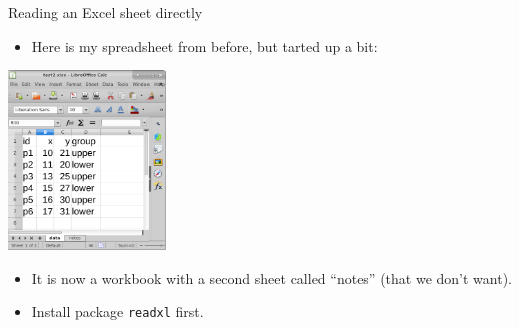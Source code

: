 \documentclass[ignorenonframetext,]{beamer}
\providecommand{\tightlist}{%
  \setlength{\itemsep}{0pt}\setlength{\parskip}{0pt}}
\begin{document}
\begin{frame}[fragile]{Reading an Excel sheet directly}
\protect\hypertarget{reading-an-excel-sheet-directly}{}

\begin{itemize}
\tightlist
\item
  Here is my spreadsheet from before, but tarted up a bit:
\end{itemize}

\includegraphics[width=\textwidth,height=1.875in]{excel.png}

\begin{itemize}
\tightlist
\item
  It is now a workbook with a second sheet called ``notes'' (that we
  don't want).
\item
  Install package \texttt{readxl} first.
\end{itemize}

\end{frame}
\end{document}
